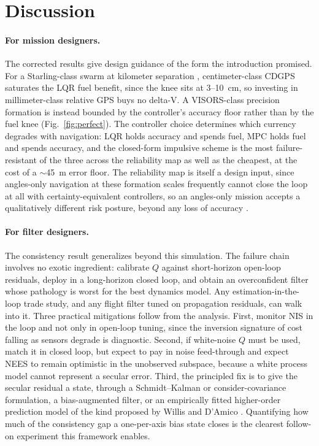 \section{Discussion}\label{sec:discussion}

\paragraph{For mission designers.}
The corrected results give design guidance of the form the introduction
promised. For a Starling-class swarm at kilometer separation
\cite{kruger2025starling}, centimeter-class CDGPS saturates the LQR fuel
benefit, since the knee sits at 3--10~cm, so investing in millimeter-class
relative GPS buys no delta-V. A VISORS-class precision formation
\cite{guffanti2023visors} is instead bounded by the controller's accuracy
floor rather than by the fuel knee (Fig.~\ref{fig:perfect}). The controller
choice determines which currency degrades with navigation: LQR holds
accuracy and spends fuel, MPC holds fuel and spends accuracy, and the
closed-form impulsive scheme is the most failure-resistant of the three
across the reliability map as well as the cheapest, at the cost of a
$\sim$45~m error floor. The reliability map is itself a design input, since
angles-only navigation at these formation scales frequently cannot close the
loop at all with certainty-equivalent controllers, so an angles-only mission
accepts a qualitatively different risk posture, beyond any loss of accuracy
\cite{damico2013argon,gaias2014anglesonly}.

\paragraph{For filter designers.}
The consistency result generalizes beyond this simulation. The failure chain
involves no exotic ingredient: calibrate $Q$ against short-horizon open-loop
residuals, deploy in a long-horizon closed loop, and obtain an overconfident
filter whose pathology is worst for the best dynamics model. Any
estimation-in-the-loop trade study, and any flight filter tuned on
propagation residuals, can walk into it. Three practical mitigations follow
from the analysis. First, monitor NIS in the loop and not only in open-loop
tuning, since the inversion signature of cost falling as sensors degrade is
diagnostic. Second, if white-noise $Q$ must be used, match it in closed
loop, but expect to pay in noise feed-through and expect NEES to remain
optimistic in the unobserved subspace, because a white process model cannot
represent a secular error. Third, the principled fix is to give the secular
residual a state, through a Schmidt--Kalman or consider-covariance
formulation, a bias-augmented filter, or an empirically fitted higher-order
prediction model of the kind proposed by Willis and D'Amico
\cite{willis2024polynomial}. Quantifying how much of the consistency gap a
one-per-axis bias state closes is the clearest follow-on experiment this
framework enables.

